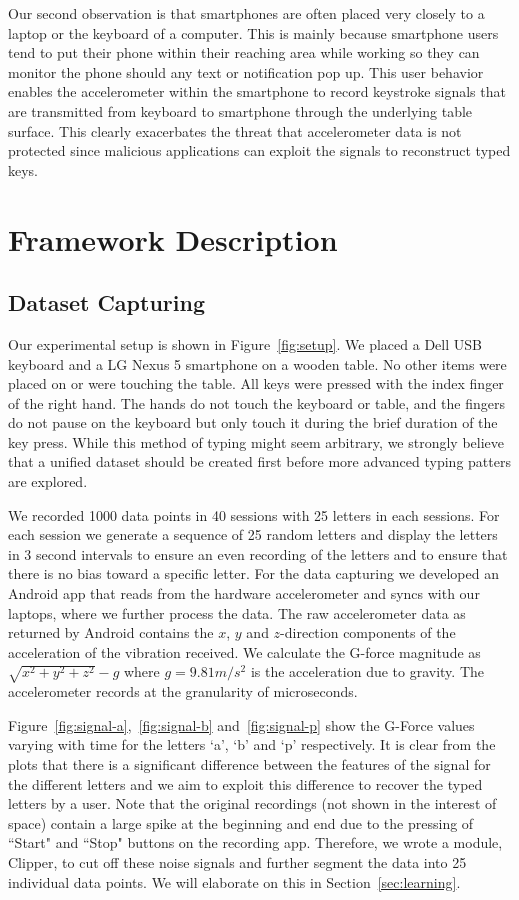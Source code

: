 \documentclass[11pt,conference]{IEEEtran}
\begin{document}
Our second observation is that smartphones are often placed very closely to a laptop or the keyboard of a computer. This is mainly because smartphone users tend to put their phone within their reaching area while working so they can monitor the phone should any text or notification pop up. This user behavior enables the accelerometer within the smartphone to record keystroke signals that are transmitted from keyboard to smartphone through the underlying table surface. This clearly exacerbates the threat that accelerometer data is not protected since malicious applications can exploit the signals to reconstruct typed keys.


\section{Framework Description}

\subsection{Dataset Capturing}
\label{sec:dataset-capturing}
Our experimental setup is shown in Figure~\ref{fig:setup}. We placed a Dell USB keyboard and a LG Nexus 5 smartphone on a wooden table. No other items were placed on or were touching the table. All keys were pressed with the index finger of the right hand. The hands do not touch the keyboard or table, and the fingers do not pause on the keyboard but only touch it during the brief duration of the key press. While this method of typing might seem arbitrary, we strongly believe that a unified dataset should be created first before more advanced typing patters are explored.

We recorded 1000 data points in 40 sessions with 25 letters in each sessions. For each session we generate a sequence of 25 random letters and display the letters in 3 second intervals to ensure an even recording of the letters and to ensure that there is no bias toward a specific letter. For the data capturing we developed an Android app that reads from the hardware accelerometer and syncs with our laptops, where we further process the data. The raw accelerometer data as returned by Android contains the $x$, $y$ and $z$-direction components of the acceleration of the vibration received. We calculate the G-force magnitude as $\sqrt{x^2+y^2+z^2}-g$ where $g = 9.81 m/s^2$ is the acceleration due to gravity. The accelerometer records at the granularity of microseconds.

Figure~\ref{fig:signal-a},~\ref{fig:signal-b} and~\ref{fig:signal-p} show the G-Force values varying with time for the
letters `a', `b' and `p' respectively. It is clear from the plots that there is a significant difference between the features
of the signal for the different letters and we aim to exploit this difference to recover the typed letters by a user.
Note that the original recordings (not shown in the interest of space) contain a large spike at the beginning and end
due to the pressing of ``Start" and ``Stop" buttons on the recording app.
Therefore, we wrote a module, Clipper, to cut off these noise signals and further segment the data into 25 individual data points.
We will elaborate on this in Section~\ref{sec:learning}.
\end{document}
